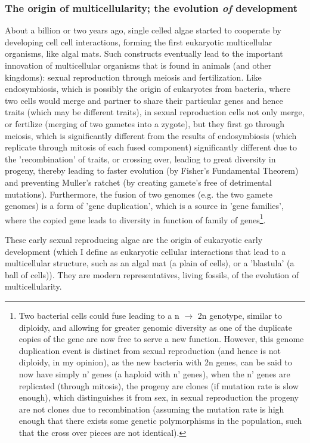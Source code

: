\subsubsection{The origin of multicellularity; the evolution \textit{of} development}
About a billion or two years ago, single celled algae started to cooperate by developing cell cell interactions, forming the first eukaryotic multicellular  organisms, like algal mats.  Such constructs eventually lead to the important innovation of multicellular organisms that is found in animals (and other kingdoms): sexual reproduction through meiosis and fertilization.  Like endosymbiosis, which is possibly the origin of eukaryotes from bacteria, where two cells would merge and partner to share their particular genes and hence traits (which may be different traits), in sexual reproduction cells not only merge, or fertilize (merging of two gametes into a zygote), but they first go through meiosis, which is significantly different from the results of endosymbiosis (which replicate through mitosis of each fused component) significantly different due to the 'recombination' of traits, or crossing over, leading to great diversity in progeny, thereby leading to faster evolution (by Fisher's Fundamental Theorem) and preventing Muller's ratchet (by creating gamete's free of detrimental mutations).  Furthermore, the fusion of two genomes (e.g. the two gamete genomes) is a form of 'gene duplication', which is a source in 'gene families', where the copied gene leads to diversity in function of family of genes\footnote{Two bacterial cells could fuse leading to a n $\rightarrow$ 2n genotype, similar to diploidy, and allowing for greater genomic diversity as one of the duplicate copies of the gene are now free to serve a new function.  However, this genome duplication event is distinct from sexual reproduction (and hence is not diploidy, in my opinion), as the new bacteria with 2n genes, can be said to now have simply n' genes (a haploid with n' genes), when the n' genes are replicated (through mitosis), the progeny are clones (if mutation rate is slow enough), which distinguishes it from sex, in sexual reproduction the progeny are not clones due to recombination (assuming the mutation rate is high enough that there exists some genetic polymorphisms in the population, such that the cross over pieces are not identical).}.  

These early sexual reproducing algae are the origin of eukaryotic early development (which I define as eukaryotic cellular interactions that lead to a multicellular structure, such as an algal mat (a plain of cells), or a 'blastula' (a ball of cells)\cite{pmid7579526}).  They are modern representatives, living fossils, of the evolution of multicellularity.  

